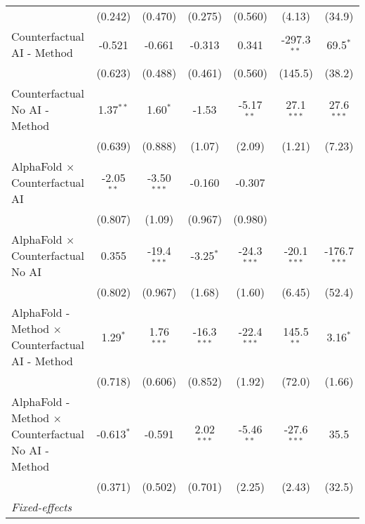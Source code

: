 \begin{tabular}{lcccccc}
                                                              & (0.242)      & (0.470)       & (0.275)       & (0.560)       & (4.13)        & (34.9)\\   
   Counterfactual AI - Method                                 & -0.521       & -0.661        & -0.313        & 0.341         & -297.3$^{**}$ & 69.5$^{*}$\\   
                                                              & (0.623)      & (0.488)       & (0.461)       & (0.560)       & (145.5)       & (38.2)\\   
   Counterfactual No AI - Method                              & 1.37$^{**}$  & 1.60$^{*}$    & -1.53         & -5.17$^{**}$  & 27.1$^{***}$  & 27.6$^{***}$\\   
                                                              & (0.639)      & (0.888)       & (1.07)        & (2.09)        & (1.21)        & (7.23)\\   
   AlphaFold $\times$ Counterfactual AI                       & -2.05$^{**}$ & -3.50$^{***}$ & -0.160        & -0.307        &               &   \\   
                                                              & (0.807)      & (1.09)        & (0.967)       & (0.980)       &               &   \\   
   AlphaFold $\times$ Counterfactual No AI                    & 0.355        & -19.4$^{***}$ & -3.25$^{*}$   & -24.3$^{***}$ & -20.1$^{***}$ & -176.7$^{***}$\\   
                                                              & (0.802)      & (0.967)       & (1.68)        & (1.60)        & (6.45)        & (52.4)\\   
   AlphaFold - Method $\times$ Counterfactual AI - Method     & 1.29$^{*}$   & 1.76$^{***}$  & -16.3$^{***}$ & -22.4$^{***}$ & 145.5$^{**}$  & 3.16$^{*}$\\   
                                                              & (0.718)      & (0.606)       & (0.852)       & (1.92)        & (72.0)        & (1.66)\\   
   AlphaFold - Method $\times$ Counterfactual No AI - Method  & -0.613$^{*}$ & -0.591        & 2.02$^{***}$  & -5.46$^{**}$  & -27.6$^{***}$ & 35.5\\   
                                                              & (0.371)      & (0.502)       & (0.701)       & (2.25)        & (2.43)        & (32.5)\\   
   \midrule
   \emph{Fixed-effects}\\

\end{tabular}

